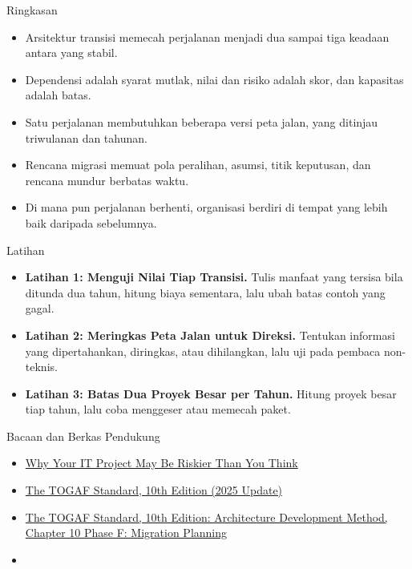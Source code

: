 \documentclass[aspectratio=169, table, 12pt]{beamer}
\begin{document}
\begin{frame}{{\Large Ringkasan}}
  \small
  \vspace{4pt}
  \begin{itemize}
    \item Arsitektur transisi memecah perjalanan menjadi dua sampai tiga keadaan antara yang stabil.
    \item Dependensi adalah syarat mutlak, nilai dan risiko adalah skor, dan kapasitas adalah batas.
    \item Satu perjalanan membutuhkan beberapa versi peta jalan, yang ditinjau triwulanan dan tahunan.
    \item Rencana migrasi memuat pola peralihan, asumsi, titik keputusan, dan rencana mundur berbatas
          waktu.
    \item Di mana pun perjalanan berhenti, organisasi berdiri di tempat yang lebih baik daripada
          sebelumnya.
  \end{itemize}
\end{frame}

\begin{frame}{{\Large Latihan}}
  \small
  \vspace{6pt}
  \begin{itemize}
    \item \textbf{Latihan 1: Menguji Nilai Tiap Transisi.} Tulis manfaat yang tersisa bila ditunda dua
          tahun, hitung biaya sementara, lalu ubah batas contoh yang gagal.
    \item \textbf{Latihan 2: Meringkas Peta Jalan untuk Direksi.} Tentukan informasi yang dipertahankan,
          diringkas, atau dihilangkan, lalu uji pada pembaca non-teknis.
    \item \textbf{Latihan 3: Batas Dua Proyek Besar per Tahun.} Hitung proyek besar tiap tahun, lalu coba
          menggeser atau memecah paket.
  \end{itemize}
\end{frame}

\begin{frame}{{\Large Bacaan dan Berkas Pendukung}}
  \small
  \vspace{6pt}
  \begin{itemize}
    \item \href{https://arxiv.org/abs/1304.0265}{Why Your IT Project May Be Riskier Than You Think}
    \item \href{https://www.opengroup.org/togaf}{The TOGAF Standard, 10th Edition (2025 Update)}
    \item \href{https://pubs.opengroup.org/togaf-standard/adm/chap10.html}{The TOGAF Standard, 10th Edition: Architecture Development Method, Chapter 10 Phase F: Migration Planning}
    \item {}
  \end{itemize}
\end{frame}
\end{document}
